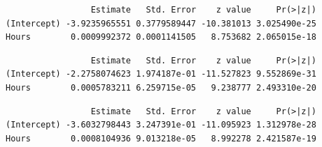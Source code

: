 \documentclass[
  french,
  letterpaper,
  DIV=11,
  numbers=noendperiod]{scrreprt}
\newenvironment{Shaded}{\begin{snugshade}}{\end{snugshade}}
\newcommand{\FunctionTok}[1]{\textcolor[rgb]{0.28,0.35,0.67}{#1}}
\newcommand{\NormalTok}[1]{\textcolor[rgb]{0.00,0.23,0.31}{#1}}
\newcommand{\SpecialCharTok}[1]{\textcolor[rgb]{0.37,0.37,0.37}{#1}}
\begin{document}
\begin{verbatim}
                 Estimate   Std. Error    z value     Pr(>|z|)
(Intercept) -3.9235965551 0.3779589447 -10.381013 3.025490e-25
Hours        0.0009992372 0.0001141505   8.753682 2.065015e-18
\end{verbatim}

\begin{Shaded}
\end{Shaded}

\begin{verbatim}
                 Estimate   Std. Error    z value     Pr(>|z|)
(Intercept) -2.2758074623 1.974187e-01 -11.527823 9.552869e-31
Hours        0.0005783211 6.259715e-05   9.238777 2.493310e-20
\end{verbatim}

\begin{Shaded}
\end{Shaded}

\begin{verbatim}
                 Estimate   Std. Error    z value     Pr(>|z|)
(Intercept) -3.6032798443 3.247391e-01 -11.095923 1.312978e-28
Hours        0.0008104936 9.013218e-05   8.992278 2.421587e-19
\end{verbatim}
\end{document}
